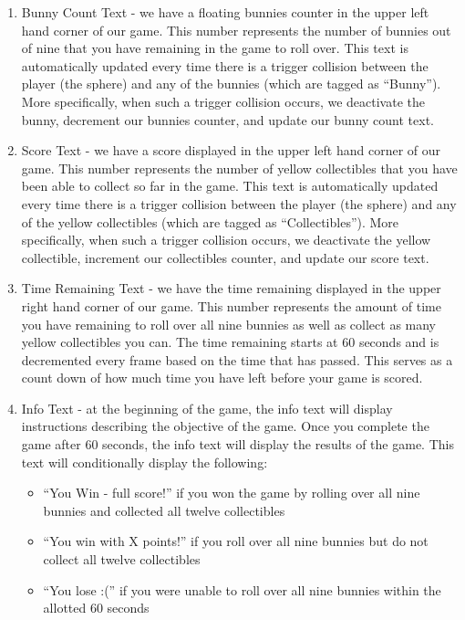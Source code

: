 \documentclass[12pt]{article}
\begin{document}
\begin{enumerate}
  \item Bunny Count Text - we have a floating bunnies counter in the upper left hand corner of our game. This number represents the number of bunnies out of nine that you have remaining in the game to roll over. This text is automatically updated every time there is a trigger collision between the player (the sphere) and any of the bunnies (which are tagged as ``Bunny''). More specifically, when such a trigger collision occurs, we deactivate the bunny, decrement our bunnies counter, and update our bunny count text.
  \item Score Text - we have a score displayed in the upper left hand corner of our game. This number represents the number of yellow collectibles that you have been able to collect so far in the game. This text is automatically updated every time there is a trigger collision between the player (the sphere) and any of the yellow collectibles (which are tagged as ``Collectibles''). More specifically, when such a trigger collision occurs, we deactivate the yellow collectible, increment our collectibles counter, and update our score text.
  \item Time Remaining Text - we have the time remaining displayed in the upper right hand corner of our game. This number represents the amount of time you have remaining to roll over all nine bunnies as well as collect as many yellow collectibles you can. The time remaining starts at 60 seconds and is decremented every frame based on the time that has passed. This serves as a count down of how much time you have left before your game is scored.
  \item Info Text - at the beginning of the game, the info text will display instructions describing the objective of the game. Once you complete the game after 60 seconds, the info text will display the results of the game. This text will conditionally display the following:
  \begin{itemize}
    \item ``You Win - full score!'' if you won the game by rolling over all nine bunnies and collected all twelve collectibles
    \item ``You win with X points!'' if you roll over all nine bunnies but do not collect all twelve collectibles
    \item ``You lose :('' if you were unable to roll over all nine bunnies within the allotted 60 seconds
  \end{itemize}
\end{enumerate}
\end{document}
